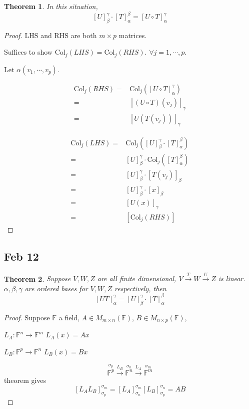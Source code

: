 \documentclass[12pt]{article}
\theoremstyle{plain}
\newtheorem{theorem}{Theorem}[subsection]
\newcommand{\Col}{\mathrm{Col}}
\newcommand{\mF}{{\mathbb{F}}}
\begin{document}
	\begin{theorem}
		In this situation, 
		\[
			[U]_{\beta}^{\gamma}\cdot 
			[T]_{\alpha}^{\beta} = [U\circ T]_{\alpha}^{\gamma} 
		\]
	\end{theorem}
	\begin{proof}
		LHS and RHS are both $m\times p$ matrices. 

		Suffices to show $\Col_j(LHS)= \Col_j(RHS)$. $\forall j = 1, \cdots, p$.
		
		Let $\alpha(v_1,\cdots, v_p)$. 

		\begin{align*}
			\Col_j(RHS) 
			=& \Col_j([U\circ T]_{\alpha}^{\gamma})\\
			=& [(U\circ T)(v_j)]_{\gamma}\\
			=& [U(T(v_j))]_{\gamma}
		\end{align*}

		\begin{align*}
			\Col_j(LHS) 
			=& \Col_j([U]_{\beta}^{\gamma} \cdot [T]_{\alpha}^{\beta})\\
			=& [U]_{\beta}^{\gamma} \cdot \Col_j([T]_{\alpha}^{\beta})\\
			=& [U]_{\beta}^{\gamma} \cdot [T(v_j)]_{\beta}\\
			=& [U]_{\beta}^{\gamma} \cdot [x]_{\beta}
			 \tag{$x = T(v_j)$}\\
			=& [U(x)]_{\gamma}\\
			=& [\Col_j(RHS)]
		\end{align*}
	\end{proof}
	
	\subsection{Feb 12}
	\begin{theorem}
		Suppose $V,W,Z$ are all finite dimensional, 
		$V\overset{T}{\longrightarrow} W\overset{U}{\longrightarrow} Z$ is linear. 
		$\alpha, \beta, \gamma$ are ordered bases for $V,W,Z$ respectively, 
		then 
		\[
			[UT] _{\alpha}^{\gamma} 
			= [U]_{\beta}^{\gamma} \cdot[T]_{\alpha}^{\beta}
		\]
	\end{theorem}
	\begin{proof}
		Suppose $\mF$ a field, $A\in M_{m\times n}(\mF)$, 
		$B\in M_{n\times p} (\mF)$, 
		\begin{description}
			\item $L_A: \mF^n \to \mF^m $ $L_A(x) = Ax$
			\item $L_B: \mF^p \to \mF^n$ $L_B(x) = Bx$
		\end{description}
		\[
			\overset{\sigma_p}{\mF^p} \overset{L_B}{\longrightarrow}
			\overset{\sigma_n}{\mF^n} \overset{L_A}{\longrightarrow} 
			\overset{\sigma_m}{\mF^m}
		\]
		theorem gives
		\[
			[L_AL_B]_{\sigma_p}^{\sigma_m}
			=[L_A]_{\sigma_n}^{\sigma_m} \left[L_B\right]_{\sigma_p}^{\sigma_n}
			= AB
		\]
	\end{proof}
\end{document}
